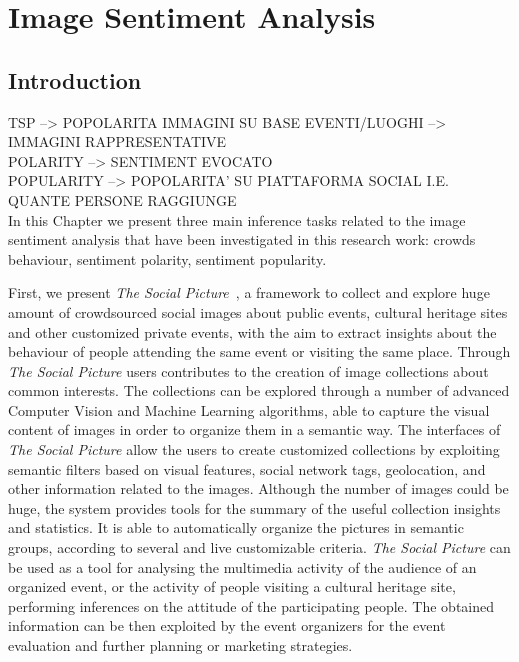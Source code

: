 \chapter{Image Sentiment Analysis}
\section{Introduction}
TSP --> POPOLARITA IMMAGINI SU BASE EVENTI/LUOGHI --> IMMAGINI RAPPRESENTATIVE
\\POLARITY --> SENTIMENT EVOCATO
\\POPULARITY --> POPOLARITA' SU PIATTAFORMA SOCIAL I.E. QUANTE PERSONE RAGGIUNGE\\
In this Chapter we present three main inference tasks related to the image sentiment analysis that have been investigated in this research work: crowds behaviour, sentiment polarity, sentiment popularity. 

First, we present \textit{The Social Picture}~\cite{battiato2016social}, a framework to collect and explore huge amount of crowdsourced social images about public events, cultural heritage sites and other customized private events, with the aim to extract insights about the behaviour of people attending the same event or visiting the same place. 
Through \textit{The Social Picture} users contributes to the creation of image collections about common interests. %
The collections can be explored through a number of advanced Computer Vision and Machine Learning algorithms, able to capture the visual content of images in order to organize them in a semantic way. The interfaces of \textit{The Social Picture} allow the users to create customized collections by exploiting semantic filters based on visual features, social network tags, geolocation, and other information related to the images.
Although the number of images could be huge, the system provides tools for the summary of the useful collection insights and statistics. It is able to automatically organize the pictures in semantic groups, according to several and live customizable criteria.
\textit{The Social Picture} can be used as a tool for analysing the multimedia activity of the audience of an organized event, or the activity of people visiting a cultural heritage site, performing inferences on the attitude of the participating people. The obtained information can be then exploited by the event organizers for the event evaluation and further planning or marketing strategies.

